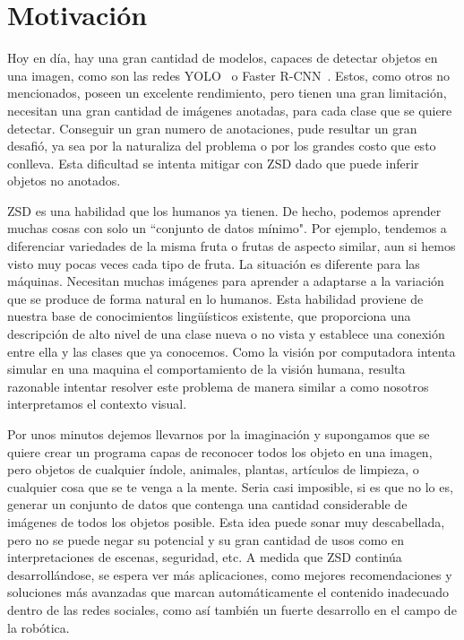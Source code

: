 \section{Motivación} \label{sec:motivacion}

Hoy en día, hay una gran cantidad de modelos, capaces de detectar objetos en una imagen, como son las redes YOLO~\cite{redmon2016you} o Faster R-CNN~\cite{ren2015faster}. Estos, como otros no mencionados, poseen un excelente rendimiento, pero tienen una gran limitación, necesitan una gran cantidad de imágenes anotadas, para cada clase que se quiere detectar. Conseguir un gran numero de anotaciones, pude resultar un gran desafió, ya sea por la naturaliza del problema o por los grandes costo que esto conlleva. Esta dificultad se intenta mitigar con ZSD dado que puede inferir objetos no anotados.

ZSD es una habilidad que los humanos ya tienen. De hecho, podemos aprender muchas cosas con solo un ``conjunto de datos mínimo". Por ejemplo, tendemos a diferenciar  variedades de la misma fruta o frutas de aspecto similar, aun si hemos visto muy pocas veces cada tipo de fruta. La situación es diferente para las máquinas. Necesitan muchas imágenes para aprender a adaptarse a la variación que se produce de forma natural en lo humanos. Esta habilidad proviene de nuestra base de conocimientos lingüísticos existente, que proporciona una descripción de alto nivel de una clase nueva o no vista y establece una conexión entre ella y las clases que ya conocemos. Como la visión por computadora intenta simular en una maquina el comportamiento de la visión humana, resulta razonable intentar resolver este problema de manera similar a como nosotros interpretamos el contexto visual.

Por unos minutos dejemos llevarnos por la imaginación y supongamos que se quiere crear un programa capas de reconocer todos los objeto en una imagen, pero objetos de cualquier índole, animales, plantas, artículos de limpieza, o cualquier cosa que se te venga a la mente. Seria casi imposible, si es que no lo es, generar un conjunto de datos que contenga una cantidad considerable de imágenes de todos los objetos posible. Esta idea puede sonar muy descabellada, pero no se puede negar su potencial y su gran cantidad de usos como en interpretaciones de escenas, seguridad, etc. A medida que ZSD continúa desarrollándose, se espera ver más aplicaciones, como mejores recomendaciones y soluciones más avanzadas que marcan automáticamente el contenido inadecuado dentro de las redes sociales, como así también un fuerte desarrollo en el campo de la robótica.


